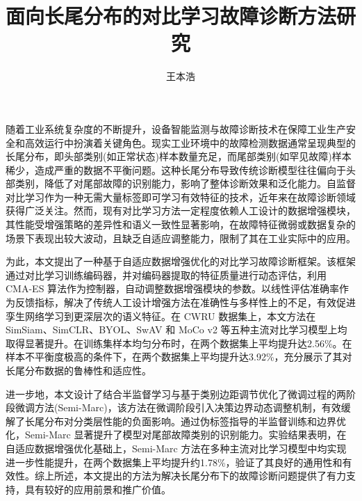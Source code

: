 \documentclass[master]{thesis-uestc}
\title{面向长尾分布的对比学习故障诊断方法研究}{}
\author{王本浩}{Wang Benhao}
\begin{document}
\makecover

\begin{chineseabstract}
    随着工业系统复杂度的不断提升，设备智能监测与故障诊断技术在保障工业生产安全和高效运行中扮演着关键角色。现实工业环境中的故障检测数据通常呈现典型的长尾分布，即头部类别(如正常状态)样本数量充足，而尾部类别(如罕见故障)样本稀少，造成严重的数据不平衡问题。这种长尾分布导致传统诊断模型往往偏向于头部类别，降低了对尾部故障的识别能力，影响了整体诊断效果和泛化能力。自监督对比学习作为一种无需大量标签即可学习有效特征的技术，近年来在故障诊断领域获得广泛关注。然而，现有对比学习方法一定程度依赖人工设计的数据增强模块，其性能受增强策略的差异性和语义一致性显著影响，在故障特征微弱或数据复杂的场景下表现出较大波动，且缺乏自适应调整能力，限制了其在工业实际中的应用。

    为此，本文提出了一种基于自适应数据增强优化的对比学习故障诊断框架。该框架通过对比学习训练编码器，并对编码器提取的特征质量进行动态评估，利用 CMA-ES 算法作为控制器，自动调整数据增强模块的参数。以线性评估准确率作为反馈指标，解决了传统人工设计增强方法在准确性与多样性上的不足，有效促进孪生网络学习到更深层次的语义特征。在 CWRU 数据集上，本文方法在 SimSiam、SimCLR、BYOL、SwAV 和 MoCo v2 等五种主流对比学习模型上均取得显著提升。在训练集样本均匀分布时，在两个数据集上平均提升达2.56\%。在样本不平衡度极高的条件下，在两个数据集上平均提升达3.92\%，充分展示了其对长尾分布数据的鲁棒性和适应性。

    进一步地，本文设计了结合半监督学习与基于类别边距调节优化了微调过程的两阶段微调方法(Semi-Marc)，该方法在微调阶段引入决策边界动态调整机制，有效缓解了长尾分布对分类层性能的负面影响。通过伪标签指导的半监督训练和边界优化，Semi-Marc 显著提升了模型对尾部故障类别的识别能力。实验结果表明，在自适应数据增强优化基础上，Semi-Marc 方法在多种主流对比学习模型中均实现进一步性能提升，在两个数据集上平均提升约1.78\%，验证了其良好的通用性和有效性。综上所述，本文提出的方法为解决长尾分布下的故障诊断问题提供了有力支持，具有较好的应用前景和推广价值。


\end{chineseabstract}
\end{document}

